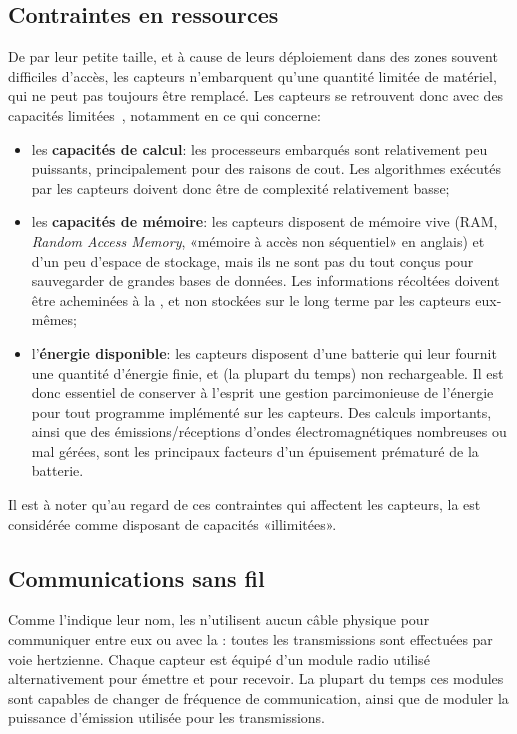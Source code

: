     \subsection{Contraintes en ressources}
De par leur petite taille, et à cause de leurs déploiement dans des zones souvent difficiles d'accès, les capteurs n'embarquent qu'une quantité limitée de matériel, qui ne peut pas toujours être remplacé.
Les capteurs se retrouvent donc avec des capacités limitées~\cite{BMS13}, notamment en ce qui concerne:
\begin{itemize}
    \item les \textbf{capacités de calcul}: les processeurs embarqués sont relativement peu puissants, principalement pour des raisons de cout.
        Les algorithmes exécutés par les capteurs doivent donc être de complexité relativement basse;
    \item les \textbf{capacités de mémoire}: les capteurs disposent de mémoire vive (RAM, \textit{Random Access Memory}, «mémoire à accès non séquentiel» en anglais) et d'un peu d'espace de stockage, mais ils ne sont pas du tout conçus pour sauvegarder de grandes bases de données.
        Les informations récoltées doivent être acheminées à la \sdb, et non stockées sur le long terme par les capteurs eux-mêmes;
    \item l'\textbf{énergie disponible}: les capteurs disposent d'une batterie qui leur fournit une quantité d'énergie finie, et (la plupart du temps) non rechargeable.
        Il est donc essentiel de conserver à l'esprit une gestion parcimonieuse de l'énergie pour tout programme implémenté sur les capteurs.
        Des calculs importants, ainsi que des émissions/réceptions d'ondes électromagnétiques nombreuses ou mal gérées, sont les principaux facteurs d'un épuisement prématuré de la batterie.
\end{itemize}

Il est à noter qu'au regard de ces contraintes qui affectent les capteurs, la \sdb est considérée comme disposant de capacités «illimitées».

    \subsection{Communications sans fil}
Comme l'indique leur nom, les \rcsfs n'utilisent aucun câble physique pour communiquer entre eux ou avec la \sdb: toutes les transmissions sont effectuées par voie hertzienne.
Chaque capteur est équipé d'un module radio utilisé alternativement pour émettre et pour recevoir.
La plupart du temps ces modules sont capables de changer de fréquence de communication, ainsi que de moduler la puissance d'émission utilisée pour les transmissions.

